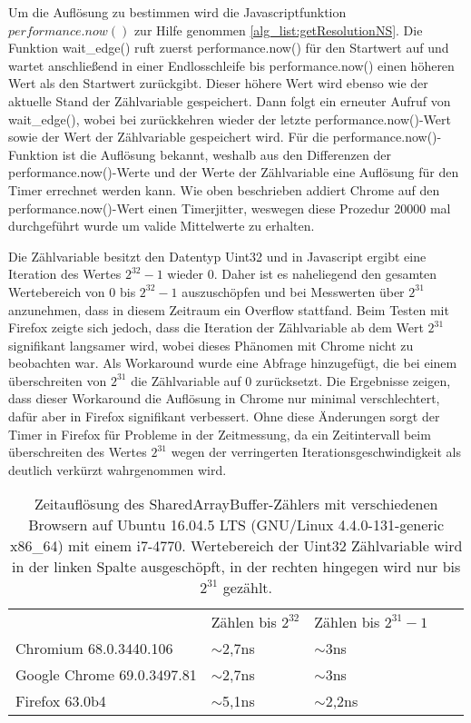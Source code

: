 Um die Auflösung zu bestimmen wird die Javascriptfunktion $performance.now()$ zur Hilfe genommen \ref{alg_list:getResolutionNS}. Die Funktion wait_edge() ruft zuerst performance.now() für den Startwert auf und wartet anschließend in einer Endlosschleife bis performance.now() einen höheren Wert als den Startwert zurückgibt. 
Dieser höhere Wert wird ebenso wie der aktuelle Stand der Zählvariable gespeichert. 
Dann folgt ein erneuter Aufruf von wait_edge(), wobei bei zurückkehren wieder der letzte performance.now()-Wert sowie der Wert der Zählvariable gespeichert wird.
Für die performance.now()-Funktion ist die Auflösung bekannt, weshalb aus den Differenzen der performance.now()-Werte und der Werte der Zählvariable eine Auflösung für den Timer errechnet werden kann.
Wie oben beschrieben addiert Chrome auf den performance.now()-Wert einen Timerjitter, weswegen diese Prozedur 20000 mal durchgeführt wurde um valide Mittelwerte zu erhalten.

Die Zählvariable besitzt den Datentyp Uint32 und in Javascript ergibt eine Iteration des Wertes $2^{32}-1$ wieder 0. 
Daher ist es naheliegend den gesamten Wertebereich von 0 bis $2^{32}-1$ auszuschöpfen und bei Messwerten über $2^{31}$ anzunehmen, dass in diesem Zeitraum ein Overflow stattfand.
Beim Testen mit Firefox zeigte sich jedoch, dass die Iteration der Zählvariable ab dem Wert $2^{31}$ signifikant langsamer wird, wobei dieses Phänomen mit Chrome nicht zu beobachten war.
Als Workaround wurde eine Abfrage hinzugefügt, die bei einem überschreiten von $2^{31}$ die Zählvariable auf 0 zurücksetzt.
Die Ergebnisse zeigen, dass dieser Workaround die Auflösung in Chrome nur minimal verschlechtert, dafür aber in Firefox signifikant verbessert.
Ohne diese Änderungen sorgt der Timer in Firefox für Probleme in der Zeitmessung, da ein Zeitintervall beim überschreiten des Wertes $2^{31}$ wegen der verringerten Iterationsgeschwindigkeit als deutlich verkürzt wahrgenommen wird.

\label{tbl:times_res}
\begin{table}[h]
\caption{Zeitauflösung des SharedArrayBuffer-Zählers mit verschiedenen Browsern auf Ubuntu 16.04.5 LTS (GNU/Linux 4.4.0-131-generic x86_64) mit einem i7-4770. Wertebereich der Uint32 Zählvariable wird in der linken Spalte ausgeschöpft, in der rechten hingegen wird nur bis $2^{31}$ gezählt.}
\begin{tabular}{lllll}
                           & Zählen bis $2^{32}$ & Zählen bis $2^{31}-1$ &  &  \\[10pt]
Chromium 68.0.3440.106     & $\sim$2,7ns                      & $\sim$3ns                        &  &  \\
Google Chrome 69.0.3497.81 & $\sim$2,7ns                      & $\sim$3ns                        &  &  \\
Firefox 63.0b4             & $\sim$5,1ns                      & $\sim$2,2ns                      &  & 
\end{tabular}
\end{table}


